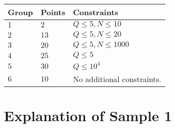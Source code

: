 \noindent
\begin{tabular}{| l | l | p{12cm} |}
  \hline
  \textbf{Group} & \textbf{Points} & \textbf{Constraints} \\ \hline
  $1$    & $2$        & $Q \leq 5, N \leq 10$ \\ \hline
  $2$    & $13$       & $Q \leq 5, N \leq 20$ \\ \hline
  $3$    & $20$       & $Q \leq 5, N \leq 1000$ \\ \hline
  $4$    & $25$       & $Q \leq 5$ \\ \hline
  $5$    & $30$       & $Q \leq 10^4$ \\ \hline
  $6$    & $10$       & No additional constraints. \\ \hline
\end{tabular}

\section*{Explanation of Sample 1}
